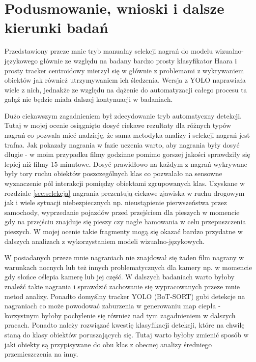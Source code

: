 \documentclass[a4paper]{article}
\begin{document}
\section{Podusmowanie, wnioski i dalsze kierunki badań}
Przedstawiony przeze mnie tryb manualny selekcji nagrań do modelu wizualno-językowego głównie ze względu na badany bardzo prosty klasyfikator Haara i prosty tracker centroidowy mierzył się w głównie z problemami z wykrywaniem obiektów jak również utrzymywaniem ich śledzenia. Wersja z YOLO naprawiała wiele z nich, jednakże ze względu na dążenie do automatyzacji całego procesu ta gałąź nie będzie miała dalszej kontynuacji w badaniach.

Dużo ciekawszym zagadnieniem był zdecydowanie tryb automatyczny detekcji. Tutaj w mojej ocenie osiągnięto dosyć ciekawe rezultaty dla różnych typów nagrań co pozwala mieć nadzieję, że sama metodyka analizy i selekcji nagrań jest trafna. Jak pokazały nagrania w fazie uczenia warto, aby nagrania były dosyć długie - w moim przypadku filmy godzinne pomimo gorszej jakości sprawdziły się lepiej niż filmy 15-minutowe. Dosyć prawidłowo na każdym z nagrań wykrywane były tory ruchu obiektów poszczególnych klas co pozwalało na sensowne wyznaczenie pól interakcji pomiędzy obiektami zgrupowanych klas. Uzyskane w rozdziale \ref{sec:selekcja} nagrania prezentują ciekawe zjawiska w ruchu drogowym jak i wiele sytuacji niebezpiecznych np. nieustąpienie pierwszeństwa przez samochody, wyprzedanie pojazdów przed przejściem dla pieszych w momencie gdy na przejściu znajduje się pieszy czy nagłe hamowania w celu przepuszczenia pieszych. W mojej ocenie takie fragmenty mogą się okazać bardzo przydatne w dalszych analizach z wykorzystaniem modeli wizualno-językowych.

W posiadanych przeze mnie nagraniach nie znajdował się żaden film nagrany w warunkach nocnych lub też innych problematycznych dla kamery np. w momencie gdy słońce oślepia kamerę lub jej część. W dalszych badaniach warto byłoby znaleźć takie nagrania i sprawdzić zachowanie się wypracowanych przeze mnie metod analizy. Ponadto domyślny tracker YOLO (BoT-SORT) gubi detekcje na nagraniach co może powodować zaburzenia w generowaniu map ciepła - korzystnym byłoby pochylenie się również nad tym zagadnieniem w dalszych pracach. Ponadto należy rozwiązać kwestię klasyfikacji detekcji, które na chwilę staną do klasy obiektów poruszających się. Tutaj warto byłoby zmienić sposób w jaki obiekty są przypisywane do obu klas z obecnej analizy średniego przemieszczenia na inny.
\end{document}
